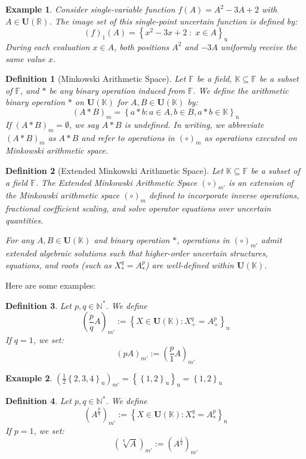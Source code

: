 \documentclass[a4paper,12pt,twoside]{memoir}
\newtheorem{definition}{Definition}[chapter]
\newtheorem{example}{Example}[chapter]
\newcommand{\set}[1]{\left\{#1\right\}} %
\newcommand{\s}[1]{\set{#1}_\mathrm{u}} %
\newcommand{\tsbd}[1]{\mathbf{U}(\mathbb{#1})}
\newcommand{\kgdd}[1]{\left(#1\right)_1} %
\newcommand{\kgdtmr}[1]{\left(#1\right)_{m'}} %
\begin{document}
	\begin{example}
		Consider single-variable function $f(A) = A^2 - 3A + 2$ with $A \in \tsbd{\mathbb{R}}$. The image set of this single-point uncertain function is defined by:
		\[
		\kgdd{f}(A) = \s{x^2 - 3x + 2 \;:\; x \in A}
		\]
		During each evaluation $x \in A$, both positions $A^2$ and $-3A$ uniformly receive the same value $x$.
	\end{example}
	
	\begin{definition}[Minkowski Arithmetic Space]
		Let $\mathbb{F}$ be a field, $\mathbb{K} \subseteq \mathbb{F}$ be a subset of $\mathbb{F}$, and $*$ be any binary operation induced from $\mathbb{F}$. We define the arithmetic binary operation $*$ on $\tsbd{K}$ for $A,B \in \tsbd{K}$ by:
		$$(A * B)_m = \s{a*b : a \in A , b\in B , a*b \in \mathbb{K}}$$
		If $(A * B)_m =\emptyset$, we say $A * B$ is undefined. In writing, we abbreviate $(A*B)_m$ as $A*B$ and refer to operations in $(\circ)_m$ as operations executed on Minkowski arithmetic space.
	\end{definition}
	
	\begin{definition}[Extended Minkowski Arithmetic Space]
		Let $\mathbb{K} \subseteq \mathbb{F}$ be a subset of a field $\mathbb{F}$. The Extended Minkowski Arithmetic Space $(\circ)_{m'}$ is an extension of the Minkowski arithmetic space $(\circ)_m$ defined to incorporate inverse operations, fractional coefficient scaling, and solve operator equations over uncertain quantities.
		
		For any $A, B \in \tsbd{K}$ and binary operation $*$, operations in $(\circ)_{m'}$ admit extended algebraic solutions such that higher-order uncertain structures, equations, and roots (such as $X^q_* = A^p_*$) are well-defined within $\tsbd{K}$.
	\end{definition}
	
	Here are some examples:
	
	\begin{definition}
		Let $p,q \in \mathbb{N}^*$.
		We define \[\kgdtmr{\frac{p}{q}A} := \s{X \in \tsbd{K}: X^q_+ = A^p_+} \]
		If $q = 1$, we set: \[\kgdtmr{pA}:= \kgdtmr{\frac{p}{1} A} \]
	\end{definition}
	
	\begin{example}
		$\kgdtmr{\frac{1}{2} \s{2,3,4}} = \s{\s{1,2}} = \s{1,2}$
	\end{example}
	
	\begin{definition}
		Let $p,q \in \mathbb{N^*}$.
		We define \[\kgdtmr{A^{\frac{p}{q}}} := \s{X \in \tsbd{K}: X^q_* = A^p_*} \]
		If $p = 1$, we set: \[\kgdtmr{\sqrt[q]{A}} := \kgdtmr{A^{\frac{1}{q}}}\]
	\end{definition}
	
\end{document}

